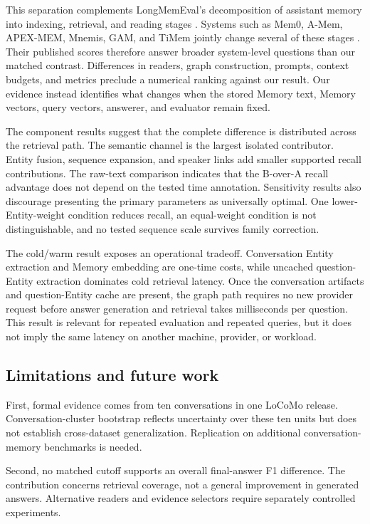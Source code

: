 \documentclass[10pt,twocolumn]{article}
\begin{document}
This separation complements LongMemEval's decomposition of assistant memory
into indexing, retrieval, and reading stages \citep{wu2025longmemeval}.
Systems such as Mem0, A-Mem, APEX-MEM, Mnemis, GAM, and TiMem jointly change
several of these stages
\citep{chhikara2025mem0,xu2025amem,banerjee2026apexmem,tang2026mnemis,wu2026gam,li2026timem}.
Their published scores therefore answer broader system-level questions than
our matched contrast. Differences in readers, graph construction, prompts,
context budgets, and metrics preclude a numerical ranking against our result.
Our evidence instead identifies what changes when the stored Memory text,
Memory vectors, query vectors, answerer, and evaluator remain fixed.

The component results suggest that the complete difference is distributed
across the retrieval path. The semantic channel is the largest isolated
contributor. Entity fusion, sequence expansion, and speaker links add smaller
supported recall contributions. The raw-text comparison indicates that the
B-over-A recall advantage does not depend on the tested time annotation.
Sensitivity results also discourage presenting the primary parameters as
universally optimal. One lower-Entity-weight condition reduces recall, an
equal-weight condition is not distinguishable, and no tested sequence scale
survives family correction.

The cold/warm result exposes an operational tradeoff. Conversation Entity
extraction and Memory embedding are one-time costs, while uncached
question-Entity extraction dominates cold retrieval latency. Once the
conversation artifacts and question-Entity cache are present, the graph path
requires no new provider request before answer generation and retrieval takes
milliseconds per question. This result is relevant for repeated evaluation
and repeated queries, but it does not imply the same latency on another
machine, provider, or workload.

\subsection{Limitations and future work}

First, formal evidence comes from ten conversations in one LoCoMo release.
Conversation-cluster bootstrap reflects uncertainty over these ten units but
does not establish cross-dataset generalization. Replication on additional
conversation-memory benchmarks is needed.

Second, no matched cutoff supports an overall final-answer F1 difference. The
contribution concerns retrieval coverage, not a general improvement in
generated answers. Alternative readers and evidence selectors require
separately controlled experiments.
\end{document}
